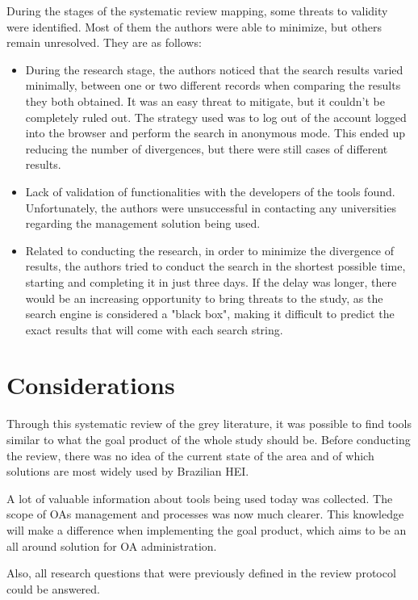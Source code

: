 During the stages of the systematic review mapping, some threats to validity were identified. Most of them the authors were able to minimize, but others remain unresolved. They are as follows:
\begin{itemize}
  \item During the research stage, the authors noticed that the search results varied minimally, between one or two different records when comparing the results they both obtained. It was an easy threat to mitigate, but it couldn't be completely ruled out. The strategy used was to log out of the account logged into the browser and perform the search in anonymous mode. This ended up reducing the number of divergences, but there were still cases of different results.
  \item Lack of validation of functionalities with the developers of the tools found. Unfortunately, the authors were unsuccessful in contacting any universities regarding the management solution being used.
  \item Related to conducting the research, in order to minimize the divergence of results, the authors tried to conduct the search in the shortest possible time, starting and completing it in just three days. If the delay was longer, there would be an increasing opportunity to bring threats to the study, as the search engine is considered a "black box", making it difficult to predict the exact results that will come with each search string.
\end{itemize}

\section{Considerations}\label{sec:gl-considerations}

Through this systematic review of the grey literature, it was possible to find tools similar to what the goal product of the whole study should be. Before conducting the review, there was no idea of the current state of the area and of which solutions are most widely used by Brazilian \ac{HEI}.

A lot of valuable information about tools being used today was collected. The scope of \aclp{OA} management and processes was now much clearer. This knowledge will make a difference when implementing the goal product, which aims to be an all around solution for \ac{OA} administration.

Also, all research questions that were previously defined in the review protocol could be answered.